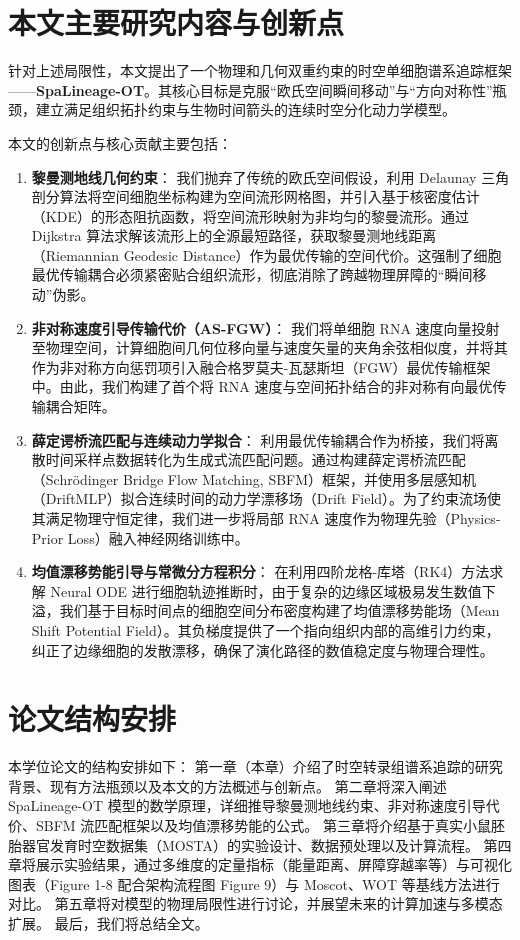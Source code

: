 \section{本文主要研究内容与创新点}
针对上述局限性，本文提出了一个物理和几何双重约束的时空单细胞谱系追踪框架——\textbf{SpaLineage-OT}。其核心目标是克服“欧氏空间瞬间移动”与“方向对称性”瓶颈，建立满足组织拓扑约束与生物时间箭头的连续时空分化动力学模型。

本文的创新点与核心贡献主要包括：
\begin{enumerate}
  \item \textbf{黎曼测地线几何约束}：
  我们抛弃了传统的欧氏空间假设，利用 Delaunay 三角剖分算法将空间细胞坐标构建为空间流形网格图，并引入基于核密度估计（KDE）的形态阻抗函数，将空间流形映射为非均匀的黎曼流形。通过 Dijkstra 算法求解该流形上的全源最短路径，获取黎曼测地线距离（Riemannian Geodesic Distance）作为最优传输的空间代价。这强制了细胞最优传输耦合必须紧密贴合组织流形，彻底消除了跨越物理屏障的“瞬间移动”伪影。
  
  \item \textbf{非对称速度引导传输代价（AS-FGW）}：
  我们将单细胞 RNA 速度向量投射至物理空间，计算细胞间几何位移向量与速度矢量的夹角余弦相似度，并将其作为非对称方向惩罚项引入融合格罗莫夫-瓦瑟斯坦（FGW）最优传输框架中。由此，我们构建了首个将 RNA 速度与空间拓扑结合的非对称有向最优传输耦合矩阵。
  
  \item \textbf{薛定谔桥流匹配与连续动力学拟合}：
  利用最优传输耦合作为桥接，我们将离散时间采样点数据转化为生成式流匹配问题。通过构建薛定谔桥流匹配（Schrödinger Bridge Flow Matching, SBFM）框架\cite{Lipman2023, Liu2023}，并使用多层感知机（DriftMLP）拟合连续时间的动力学漂移场（Drift Field）。为了约束流场使其满足物理守恒定律，我们进一步将局部 RNA 速度作为物理先验（Physics-Prior Loss）融入神经网络训练中。
  
  \item \textbf{均值漂移势能引导与常微分方程积分}：
  在利用四阶龙格-库塔（RK4）方法求解 Neural ODE 进行细胞轨迹推断时，由于复杂的边缘区域极易发生数值下溢，我们基于目标时间点的细胞空间分布密度构建了均值漂移势能场（Mean Shift Potential Field）。其负梯度提供了一个指向组织内部的高维引力约束，纠正了边缘细胞的发散漂移，确保了演化路径的数值稳定度与物理合理性。
\end{enumerate}

\section{论文结构安排}
本学位论文的结构安排如下：
第一章（本章）介绍了时空转录组谱系追踪的研究背景、现有方法瓶颈以及本文的方法概述与创新点。
第二章将深入阐述 SpaLineage-OT 模型的数学原理，详细推导黎曼测地线约束、非对称速度引导代价、SBFM 流匹配框架以及均值漂移势能的公式。
第三章将介绍基于真实小鼠胚胎器官发育时空数据集（MOSTA）的实验设计、数据预处理以及计算流程。
第四章将展示实验结果，通过多维度的定量指标（能量距离、屏障穿越率等）与可视化图表（Figure 1-8 配合架构流程图 Figure 9）与 Moscot、WOT 等基线方法进行对比。
第五章将对模型的物理局限性进行讨论，并展望未来的计算加速与多模态扩展。
最后，我们将总结全文。
